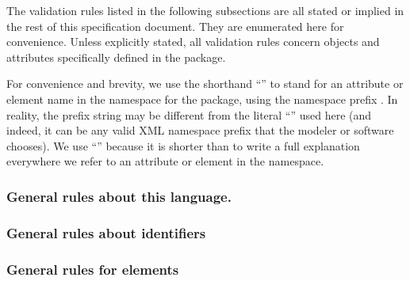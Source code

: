 The validation rules listed in the following subsections are all stated
or implied in the rest of this specification document. They are
enumerated here for convenience. Unless explicitly stated, all
validation rules concern objects and attributes specifically defined in
the \TestTSBXMLLibraryPackage package.

For \notice convenience and brevity, we use the shorthand
``'' to stand for an attribute or element name 
in the namespace for the \TestTSBXMLLibraryPackage package, using the
namespace prefix . In reality, the prefix string may be
different from the literal ``'' used here (and indeed, it can
be any valid XML namespace prefix that the modeler or software chooses).
We use ``'' because it is shorter than to write a full
explanation everywhere we refer to an attribute or element in the
\TestTSBXMLLibraryPackage namespace.

\subsubsection*{General rules about this language.}



\subsubsection*{General rules about identifiers}




\subsubsection*{General rules for \TestAnnotation elements}

